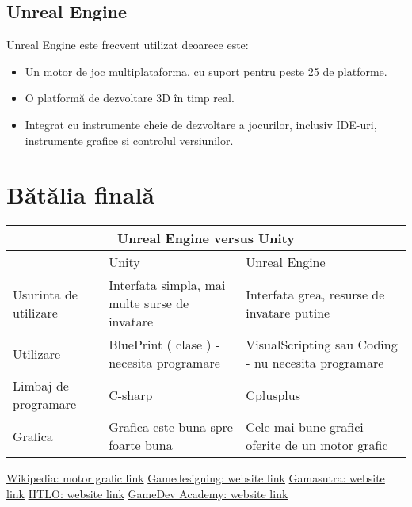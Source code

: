 \documentclass[12pt]{article}
\begin{document}
\subsection{Unreal Engine}
Unreal Engine este frecvent utilizat deoarece este:
\begin{itemize}
\item Un motor de joc multiplataforma, cu suport pentru peste 25 de platforme.
\item O platformă de dezvoltare 3D în timp real.
\item Integrat cu instrumente cheie de dezvoltare a jocurilor, inclusiv IDE-uri, instrumente grafice și controlul versiunilor.
\end{itemize}

\newpage
\section{B\u{a}t\u{a}lia final\u{a}}
\begin{tabular}{ |p{3cm}|p{3cm}|p{3cm}|  }
\hline
\multicolumn{3}{|c|}{Unreal Engine versus Unity} \\
\hline
& Unity & Unreal Engine \\
\hline
Usurinta de utilizare & Interfata simpla, mai multe surse de invatare   & Interfata grea, resurse de invatare putine \\
Utilizare & BluePrint ( clase ) - necesita programare & VisualScripting sau Coding - nu necesita programare \\
Limbaj de programare  & C-sharp &  Cplusplus \\
Grafica & Grafica este buna spre foarte buna & Cele mai bune grafici oferite de un motor grafic \\
\hline
\end{tabular}

\newpage
\begin{thebibliography}{}
\href{https://ro.wikipedia.org/wiki/Motor_grafic}{Wikipedia: motor grafic link}
\href{https://www.gamedesigning.org/career/video-game-engines/}{Gamedesigning: website link}
\href{https://www.gamasutra.com/}{Gamasutra: website link}
\href{https://www.htlo.co.uk/unity-vs-unreal-engine-a-quick-comparison/}{HTLO: website link}
\href{https://gamedevacademy.org/unity-vs-unreal/}{GameDev Academy: website link}
\end{thebibliography}
\end{document}
